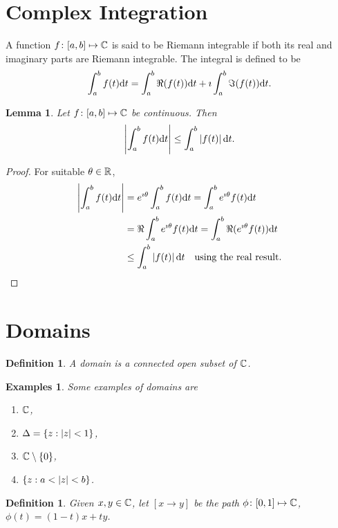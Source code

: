 \documentclass{notes}
\theoremstyle{plain}
\newtheorem{definition}[proposition]{Definition}
\newtheorem{lemma}[proposition]{Lemma}
\newtheorem*{examples}{Examples}
\begin{document}
\section{Complex Integration}

A function $f \colon [a,b] \mapsto \mathbb{C}$ is said to be Riemann integrable if both
its real and imaginary parts are Riemann integrable.  The integral is defined
to be
\[
\int_a^b f(t) \mathrm{d} t = \int_a^b \Re(f(t)) \mathrm{d} t + \imath \int_a^b \Im(f(t)) \mathrm{d} t.
\]

\begin{lemma}
Let $f \colon [a,b] \mapsto \mathbb{C}$ be continuous.  Then
\[
\left|\int_a^b f(t) \mathrm{d} t\right| \le \int_a^b \left|f(t)\right| \mathrm{d} t.
\]
\end{lemma}

\begin{proof}
For suitable $\theta \in \mathbb{R}$,
\begin{align*}
\left|\int_a^b f(t) \mathrm{d} t\right| &= e^{\imath \theta} \int_a^b f(t) \mathrm{d} t
= \int_a^b e^{\imath \theta} f(t) \mathrm{d} t \\
&= \Re \int_a^b e^{\imath \theta} f(t) \mathrm{d} t = \int_a^b \Re(e^{\imath \theta}
f(t)) \mathrm{d} t \\
&\le \int_a^b \left|f(t)\right| \mathrm{d} t \quad \text{using the real result.}
\end{align*}
\end{proof}

\section{Domains}

\begin{definition}
A domain is a connected open subset of $\mathbb{C}$.
\end{definition}

\begin{examples}
Some examples of domains are
\begin{enumerate}
\item $\mathbb{C}$,
\item $\Delta = \{ z : \left|z\right| < 1 \}$,
\item $\mathbb{C} \setminus \{ 0 \}$,
\item $\{ z : a < \left|z\right| < b \}$.
\end{enumerate}
\end{examples}

\begin{definition}
Given $x, y \in \mathbb{C}$, let $[x \rightarrow y]$ be the path $\phi \colon [0,1] \mapsto
\mathbb{C}$, $\phi(t) = (1-t) x + t y$.
\end{definition}
\end{document}
